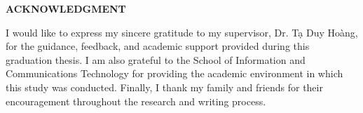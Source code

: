 \documentclass[../main.tex]{subfiles}
\begin{document}
\begin{center}
    \Large{\textbf{ACKNOWLEDGMENT}}\\
\end{center}
\vspace{1cm}
I would like to express my sincere gratitude to my supervisor, Dr. Tạ Duy Hoàng, for the guidance, feedback, and academic support provided during this graduation thesis. I am also grateful to the School of Information and Communications Technology for providing the academic environment in which this study was conducted. Finally, I thank my family and friends for their encouragement throughout the research and writing process.
\end{document}
